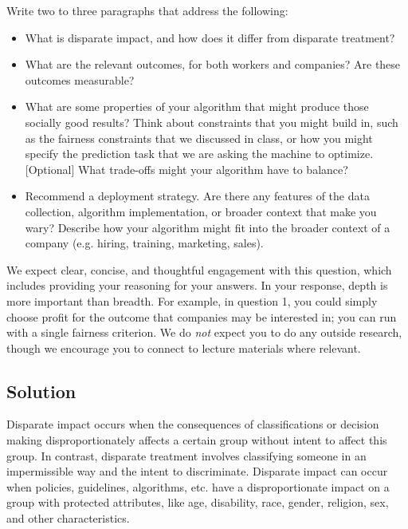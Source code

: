 \documentclass[submit]{harvardml}
\begin{document}
\begin{problem}
Write two to three paragraphs that address the following:
\begin{itemize}
\item What is disparate impact, and how does it differ from disparate treatment?  
\item What are the relevant outcomes, for both workers and companies?  Are these outcomes measurable?  
\item What are some properties of your algorithm that might produce those socially good results?  Think about constraints that you might build in, such as the fairness constraints that we discussed in class, or how you might specify the prediction task that we are asking the machine to optimize.  [Optional] What trade-offs might your algorithm have to balance?  
\item Recommend a deployment strategy.  Are there any features of the data collection, algorithm implementation, or broader context that make you wary?  Describe how your algorithm might fit into the broader context of a company (e.g. hiring, training, marketing, sales).  
\end{itemize} 

We expect clear, concise, and thoughtful engagement with this question, which includes providing your reasoning for your answers.  In your response, depth is more important than breadth.  For example, in question 1, you could simply choose profit for the outcome that companies may be interested in; you can run with a single fairness criterion. We do \emph{not} expect you to do any outside research, though we encourage you to connect to lecture materials where relevant.

\end{problem}

\subsection*{Solution}
  
  Disparate impact occurs when the consequences of classifications or decision making disproportionately affects a certain group without intent to affect this group. In contrast, disparate treatment involves classifying someone in an impermissible way and the intent to discriminate. Disparate impact can occur when policies, guidelines, algorithms, etc. have a disproportionate impact on a group with protected attributes, like age, disability, race, gender, religion, sex, and other characteristics.
\end{document}
